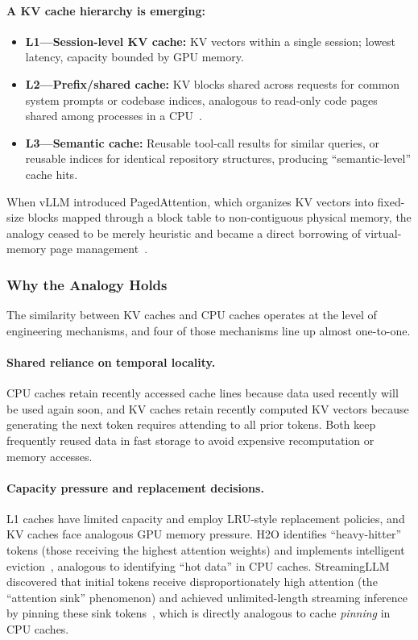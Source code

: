 \paragraph{A KV cache hierarchy is emerging:}
\begin{itemize}[nosep]
\item \textbf{L1---Session-level KV cache:} KV vectors within a single session; lowest latency, capacity bounded by GPU memory.
\item \textbf{L2---Prefix/shared cache:} KV blocks shared across requests for common system prompts or codebase indices, analogous to read-only code pages shared among processes in a CPU~\cite{vllm_prefix_2026,sglang_docs_2026,gim2024promptcache}.
\item \textbf{L3---Semantic cache:} Reusable tool-call results for similar queries, or reusable indices for identical repository structures, producing ``semantic-level'' cache hits.
\end{itemize}

When vLLM introduced PagedAttention, which organizes KV vectors into fixed-size blocks mapped through a block table to non-contiguous physical memory, the analogy ceased to be merely heuristic and became a direct borrowing of virtual-memory page management~\cite{kwon2023pagedattention}.

\subsubsection{Why the Analogy Holds}

The similarity between KV caches and CPU caches operates at the level of engineering mechanisms, and four of those mechanisms line up almost one-to-one.

\paragraph{Shared reliance on temporal locality.}
CPU caches retain recently accessed cache lines because data used recently will be used again soon, and KV caches retain recently computed KV vectors because generating the next token requires attending to all prior tokens.
Both keep frequently reused data in fast storage to avoid expensive recomputation or memory accesses.

\paragraph{Capacity pressure and replacement decisions.}
L1 caches have limited capacity and employ LRU-style replacement policies, and KV caches face analogous GPU memory pressure.
H2O identifies ``heavy-hitter'' tokens (those receiving the highest attention weights) and implements intelligent eviction~\cite{h2o2023}, analogous to identifying ``hot data'' in CPU caches.
StreamingLLM discovered that initial tokens receive disproportionately high attention (the ``attention sink'' phenomenon) and achieved unlimited-length streaming inference by pinning these sink tokens~\cite{xiao2024streamingllm}, which is directly analogous to cache \textit{pinning} in CPU caches.

